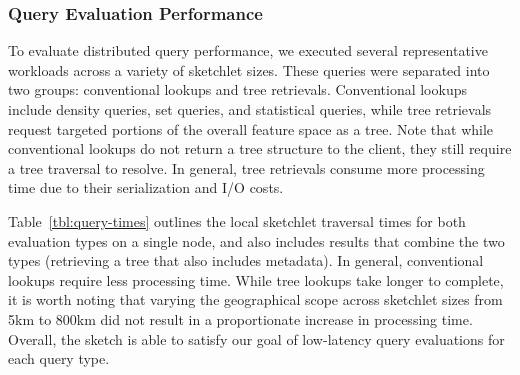 \subsubsection{Query Evaluation Performance}
To evaluate distributed query performance, we executed several representative workloads across a variety of sketchlet sizes. These queries were separated into two groups: conventional lookups and tree retrievals. Conventional lookups include density queries, set queries, and statistical queries, while tree retrievals request targeted portions of the overall feature space as a tree.  Note that while conventional lookups do not return a tree structure to the client, they still require a tree traversal to resolve. In general, tree retrievals consume more processing time due to their serialization and I/O costs.

Table~\ref{tbl:query-times} outlines the local sketchlet traversal times for both evaluation types on a single node, and also includes results that combine the two types (retrieving a tree that also includes metadata). In general, conventional lookups require less processing time. While tree lookups take longer to complete, it is worth noting that varying the geographical scope across sketchlet sizes from 5km to 800km did not result in a proportionate increase in processing time. Overall, the sketch is able to satisfy our goal of low-latency query evaluations for each query type.

